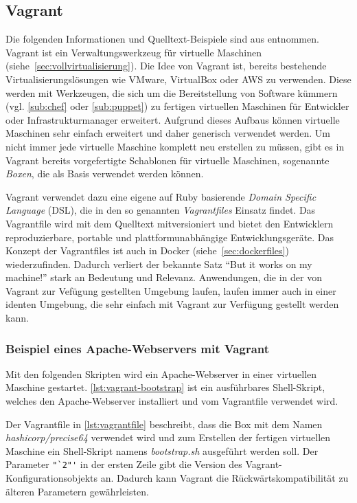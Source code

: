 \subsection{Vagrant}
\label{sub:vagrant}
Die folgenden Informationen und Quelltext-Beispiele sind aus \autocite{Vagrant:online} entnommen.
Vagrant ist ein Verwaltungswerkzeug für virtuelle Maschinen (siehe~\cref{sec:vollvirtualisierung}).
Die Idee von Vagrant ist, bereits bestehende Virtualisierungslösungen wie VMware, VirtualBox oder AWS zu verwenden.
Diese werden mit Werkzeugen, die sich um die Bereitstellung von Software kümmern (vgl. \cref{sub:chef} oder \cref{sub:puppet}) zu fertigen virtuellen Maschinen für Entwickler oder Infrastrukturmanager erweitert.
Aufgrund dieses Aufbaus können virtuelle Maschinen sehr einfach erweitert und daher generisch verwendet werden.
Um nicht immer jede virtuelle Maschine komplett neu erstellen zu müssen, gibt es in Vagrant bereits vorgefertigte Schablonen für virtuelle Maschinen, sogenannte \emph{Boxen}, die als Basis verwendet werden können.

Vagrant verwendet dazu eine eigene auf Ruby basierende \emph{Domain Specific Language} (DSL), die in den so genannten \emph{Vagrantfiles} Einsatz findet.
Das Vagrantfile wird mit dem Quelltext mitversioniert und bietet den Entwicklern reproduzierbare, portable und plattformunabhängige Entwicklungsgeräte.
Das Konzept der Vagrantfiles ist auch in Docker (siehe~\cref{sec:dockerfiles}) wiederzufinden.
Dadurch verliert der bekannte Satz ``But it works on my machine!'' stark an Bedeutung und Relevanz.
Anwendungen, die in der von Vagrant zur Vefügung gestellten Umgebung laufen, laufen immer auch in einer identen Umgebung, die sehr einfach mit Vagrant zur Verfügung gestellt werden kann.

\subsubsection{Beispiel eines Apache-Webservers mit Vagrant}
Mit den folgenden Skripten wird ein Apache-Webserver in einer virtuellen Maschine gestartet.
\cref{lst:vagrant-bootstrap} ist ein ausführbares Shell-Skript, welches den Apache-Webserver installiert und vom Vagrantfile verwendet wird.

Der Vagrantfile in \cref{lst:vagrantfile} beschreibt, dass die Box mit dem Namen \emph{hashicorp/precise64} verwendet wird und zum Erstellen der fertigen virtuellen Maschine ein Shell-Skript namens \emph{bootstrap.sh} ausgeführt werden soll.
Der Parameter \lstinline{"`2"'} in der ersten Zeile gibt die Version des Vagrant-Konfigurationsobjekts an.
Dadurch kann Vagrant die Rückwärtskompatibilität zu älteren Parametern gewährleisten.



